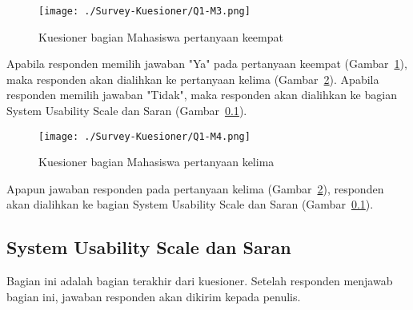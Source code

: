 \begin{figure}[H]
	\centering  
	\texttt{[image: ./Survey-Kuesioner/Q1-M3.png]}  
	\caption[Kuesioner bagian Mahasiswa pertanyaan keempat]{Kuesioner bagian Mahasiswa pertanyaan keempat} 
	\label{fig:q1-m3} 
\end{figure}

Apabila responden memilih jawaban "Ya" pada pertanyaan keempat (Gambar~\ref{fig:q1-m3}), maka responden akan dialihkan ke pertanyaan kelima (Gambar~\ref{fig:q1-m4}). Apabila responden memilih jawaban "Tidak", maka responden akan dialihkan ke bagian System Usability Scale dan Saran (Gambar~\ref{subsec:final}).

\begin{figure}[H]
	\centering  
	\texttt{[image: ./Survey-Kuesioner/Q1-M4.png]}  
	\caption[Kuesioner bagian Mahasiswa pertanyaan kelima]{Kuesioner bagian Mahasiswa pertanyaan kelima} 
	\label{fig:q1-m4} 
\end{figure}

Apapun jawaban responden pada pertanyaan kelima (Gambar~\ref{fig:q1-m4}), responden akan dialihkan ke bagian System Usability Scale dan Saran (Gambar~\ref{subsec:final}).

\subsection{System Usability Scale dan Saran}
\label{subsec:final}

Bagian ini adalah bagian terakhir dari kuesioner. Setelah responden menjawab bagian ini, jawaban responden akan dikirim kepada penulis.



\label{sec:full-result-survey}










